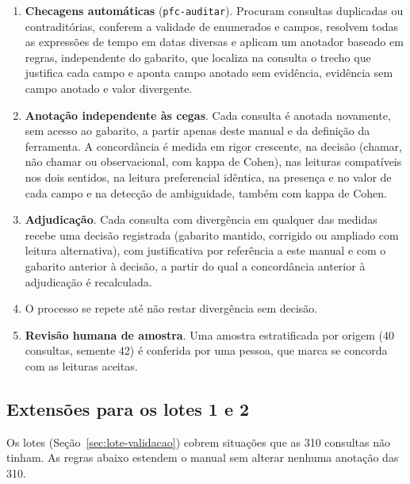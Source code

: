 \begin{enumerate}
  \item \textbf{Checagens automáticas} (\texttt{pfc-auditar}). Procuram consultas duplicadas ou contraditórias, conferem a validade de enumerados e campos, resolvem todas as expressões de tempo em datas diversas e aplicam um anotador baseado em regras, independente do gabarito, que localiza na consulta o trecho que justifica cada campo e aponta campo anotado sem evidência, evidência sem campo anotado e valor divergente.
  \item \textbf{Anotação independente às cegas}. Cada consulta é anotada novamente, sem acesso ao gabarito, a partir apenas deste manual e da definição da ferramenta. A concordância é medida em rigor crescente, na decisão (chamar, não chamar ou observacional, com kappa de Cohen), nas leituras compatíveis nos dois sentidos, na leitura preferencial idêntica, na presença e no valor de cada campo e na detecção de ambiguidade, também com kappa de Cohen.
  \item \textbf{Adjudicação}. Cada consulta com divergência em qualquer das medidas recebe uma decisão registrada (gabarito mantido, corrigido ou ampliado com leitura alternativa), com justificativa por referência a este manual e com o gabarito anterior à decisão, a partir do qual a concordância anterior à adjudicação é recalculada.
  \item O processo se repete até não restar divergência sem decisão.
  \item \textbf{Revisão humana de amostra}. Uma amostra estratificada por origem (40 consultas, semente 42) é conferida por uma pessoa, que marca se concorda com as leituras aceitas.
\end{enumerate}

\subsection*{Extensões para os lotes 1 e 2}

Os lotes (Seção~\ref{sec:lote-validacao}) cobrem situações que as 310 consultas não tinham. As regras abaixo estendem o manual sem alterar nenhuma anotação das 310.

